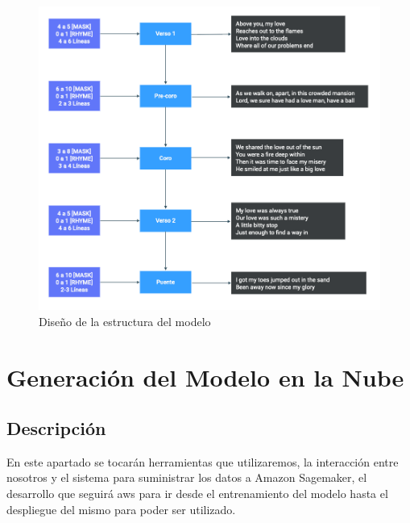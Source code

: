 \documentclass[12pt, a4paper, titlepage]{report}
\begin{document}
		\begin{figure}[H]
			\includegraphics[width=15cm]{./imagenes/Disenio/Iteracion_3/lyrics_template.png}
			\centering 
			\caption{Diseño de la estructura del modelo}
		\end{figure}
		
		\newpage
	
	\section{Generación del Modelo en la Nube} %
	\subsection{Descripción}
	
	En este apartado se tocarán herramientas que utilizaremos, la interacción entre nosotros y el sistema para suministrar los datos a Amazon Sagemaker, el desarrollo que seguirá \acrshort{aws} para ir desde el entrenamiento del modelo hasta el despliegue del mismo para poder ser utilizado.
	
\end{document}
